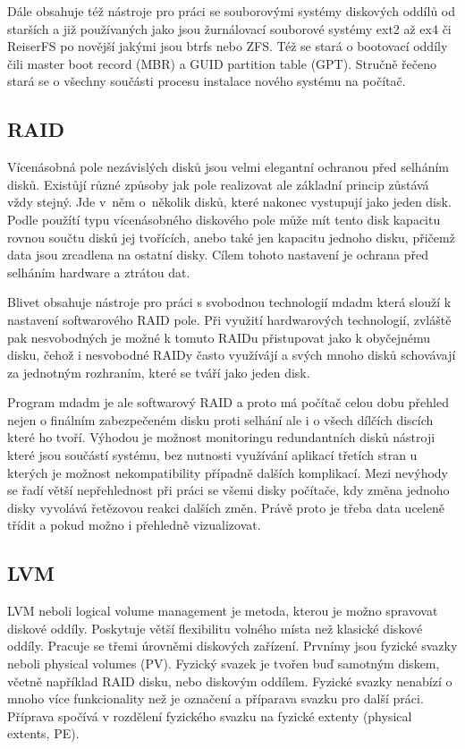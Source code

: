 \documentclass[color,table,oneside,nolot,nolof]{fithesis}
\begin{document}
	Dále obsahuje též nástroje pro práci se souborovými systémy diskových oddílů od starších a již používaných jako jsou žurnálovací souborové systémy ext2 až ex4 či ReiserFS po novější
	jakými jsou btrfs nebo ZFS. Též se stará o bootovací oddíly čili master boot record (MBR) a GUID partition table (GPT). Stručně řečeno stará se o všechny součásti procesu instalace
	nového systému na počítač.

\subsection{RAID}
	Vícenásobná pole nezávislých disků jsou velmi elegantní ochranou před selháním disků. Existůjí různé způsoby jak pole realizovat ale základní princip zůstává vždy stejný. Jde v~něm
	o~několik disků, které nakonec vystupují jako jeden disk. Podle použítí typu vícenásobného diskového pole může mít tento disk kapacitu rovnou součtu disků jej tvořících, anebo také
	jen kapacitu jednoho disku, přičemž data jsou zrcadlena na ostatní disky. Cílem tohoto nastavení je ochrana před selháním hardware a ztrátou dat. 
	
	Blivet obsahuje nástroje pro práci s svobodnou technologií mdadm která slouží k nastavení softwarového RAID pole. Při využití hardwarových technologií, zvláště pak nesvobodných
	je možné k tomuto RAIDu přistupovat jako k obyčejnému disku, čehož i nesvobodné RAIDy často využívájí a svých mnoho disků schovávají za jednotným rozhraním, které se tváří jako jeden
	disk. 

	Program mdadm je ale softwarový RAID a proto má počítač celou dobu přehled nejen o finálním zabezpečeném disku proti selhání ale i o všech dílčích discích které ho tvoří. Výhodou je
	možnost monitoringu redundantních disků nástroji které jsou součástí systému, bez nutnosti využívání aplikací třetích stran u kterých je možnost nekompatibility případně dalších komplikací.
	Mezi nevýhody se řadí větší nepřehlednost při práci se všemi disky počítače, kdy změna jednoho disky vyvolává řetězovou reakci dalších změn. Právě proto je třeba data uceleně třídit a 
	pokud možno i přehledně vizualizovat.

\subsection{LVM}
  LVM neboli logical volume management je metoda, kterou je možno spravovat diskové oddíly. Poskytuje větší flexibilitu volného místa než klasické diskové oddíly. Pracuje se třemi úrovněmi
	diskových zařízení. Prvnímy jsou fyzické svazky neboli physical volumes (PV). Fyzický svazek je tvořen buď samotným diskem, včetně například RAID disku, nebo diskovým oddílem. Fyzické
	svazky nenabízí o mnoho více funkcionality než je označení a příparava svazku pro další práci. Příprava spočívá v rozdělení fyzického svazku na fyzické extenty (physical extents, PE).
\end{document}
